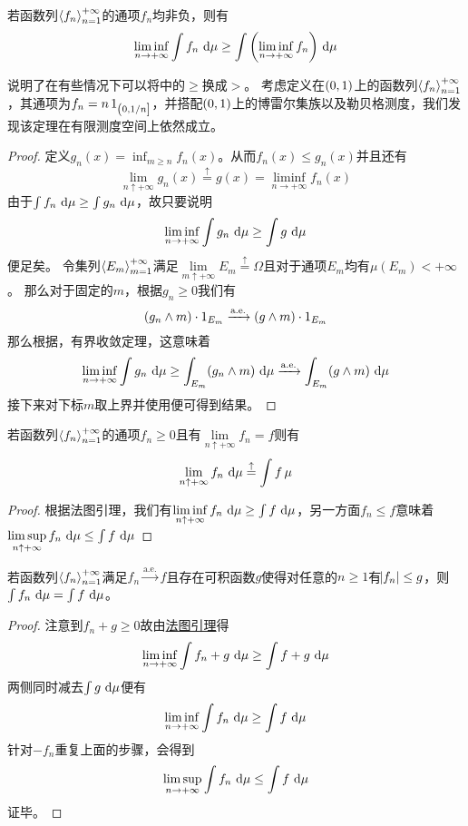 \documentclass[../main.tex]{subfiles}
\begin{document}
\begin{theorem}
	\label{thm:1.5.5}
	若函数列\(\left<f_n\right>^{+\infty}_{n=1}\)的通项\(f_n\)均非负，则有
	\[\liminf_{n\rightarrow+\infty}\int f_n\,\dif\mu\geq\int\del{\liminf_{n\rightarrow+\infty}f_n}\,\dif\mu\]
\end{theorem}
\begin{example}
	说明了在有些情况下可以将中的\(\geq\)换成\(>\)。
	考虑定义在\(\intoo{0,1}\)上的函数列\(\left<f_n\right>^{+\infty}_{n=1}\)，其通项为\(f_n=n\indicator_{\intoc{0,1/n}}\)，并搭配\(\intoo{0,1}\)上的博雷尔集族以及勒贝格测度，我们发现该定理在有限测度空间上依然成立。
\end{example}
\begin{proof}
	定义\(g_n(x)=\inf_{m\geq n}f_n(x)\)。从而\(f_n(x)\leq g_n(x)\)并且还有
	\[\lim\limits_{n\uparrow+\infty} g_n(x)\stackrel{\uparrow}{=}g(x)=\liminf_{n\rightarrow+\infty}f_n(x)\]
	由于\(\int f_n\,\dif\mu\geq\int g_n\,\dif\mu\)，故只要说明
	\[\liminf_{n\rightarrow+\infty}\int g_n\,\dif\mu\geq\int g\,\dif\mu\]
	便足矣。
	令集列\(\left<E_m\right>^{+\infty}_{m=1}\)满足\(\lim\limits_{m\uparrow+\infty}E_m\stackrel{\uparrow}{=}\Omega\)且对于通项\(E_m\)均有\(\mu(E_m)<+\infty\)。
	那么对于固定的\(m\)，根据\(g_n\geq0\)我们有
	\[(g_n\wedge m)\cdot\operatorname{1}_{E_m}\xrightarrow{\text{a.e.}}(g\wedge m)\cdot\operatorname{1}_{E_m}\]
	那么根据，有界收敛定理，这意味着
	\[\liminf_{n\rightarrow+\infty}\int g_n\,\dif\mu\geq\int_{E_m}(g_n\wedge m)\,\dif\mu\xrightarrow{\text{a.e.}}\int_{E_m}(g\wedge m)\,\dif\mu\]
	接下来对下标\(m\)取上界并使用便可得到结果。
\end{proof}

\begin{theorem}
\label{thm:1.5.7}
若函数列\(\left<f_n\right>^{+\infty}_{n=1}\)的通项\(f_n\geq0\)且有\(\lim\limits_{n\uparrow+\infty}f_n=f\)则有
\[\lim\limits_{n\uparrow+\infty}f_n\,\dif\mu\stackrel{\uparrow}{=}\int f\,\mu\]
\end{theorem}
\begin{proof}
	根据法图引理，我们有\(\liminf\limits_{n\uparrow+\infty}f_n\,\dif\mu\geq\int f\,\dif\mu\)，另一方面\(f_n\leq f\)意味着\(\limsup\limits_{n\uparrow+\infty}f_n\,\dif\mu\leq\int f\,\dif\mu\)
\end{proof}

\begin{theorem}
	\label{thm:1.5.8}
	若函数列\(\left<f_n\right>^{+\infty}_{n=1}\)满足\(f_n\xrightarrow{\text{a.e.}}f\)且存在可积函数\(g\)使得对任意的\(n\geq1\)有\(\envert{f_n}\leq g\)，则\(\int f_n\,\dif\mu=\int f\,\dif\mu\)。
\end{theorem}
\begin{proof}
	注意到\(f_n+g\geq0\)故由\hyperref[thm:1.5.5]{法图引理}得
	\[\liminf_{n\rightarrow+\infty}\int f_n+g\,\dif\mu\geq\int f+g\,\dif\mu\]
	两侧同时减去\(\int g\,\dif\mu\)便有
	\[\liminf_{n\rightarrow+\infty}\int f_n\,\dif\mu\geq\int f\,\dif\mu\]
	针对\(-f_n\)重复上面的步骤，会得到
	\[\limsup_{n\rightarrow+\infty}\int f_n\,\dif\mu\leq\int f\,\dif\mu\]
	证毕。
\end{proof}
\end{document}
